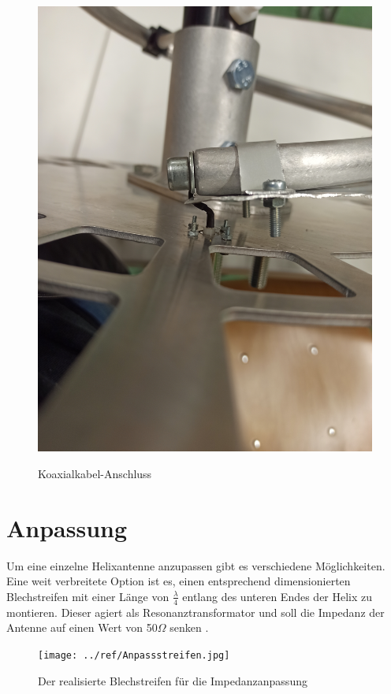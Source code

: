\begin{figure}[H]
\begin{minipage}[b]{.4\linewidth}
		\includegraphics[angle=270,width=\linewidth]{../ref/Befestigung-Innenleiter.jpg}
		\label{fig:Innenleiter-Befestigung}
	\end{minipage}
	\caption{Koaxialkabel-Anschluss}
\end{figure}

\section{Anpassung}
Um eine einzelne Helixantenne anzupassen gibt es verschiedene Möglichkeiten. Eine weit verbreitete Option ist es, einen entsprechend dimensionierten Blechstreifen mit einer Länge von $\frac{\lambda}{4}$ entlang des unteren Endes der Helix zu montieren. Dieser agiert als Resonanztransformator und soll die Impedanz der Antenne auf einen Wert von 50$\Omega$ senken \cite{kgwadi_parametric_2014}.

\begin{figure}[H]
	\centering
	\texttt{[image: ../ref/Anpassstreifen.jpg]}
	\caption{Der realisierte Blechstreifen für die Impedanzanpassung}
	\label{fig:matching-strip}
\end{figure}

